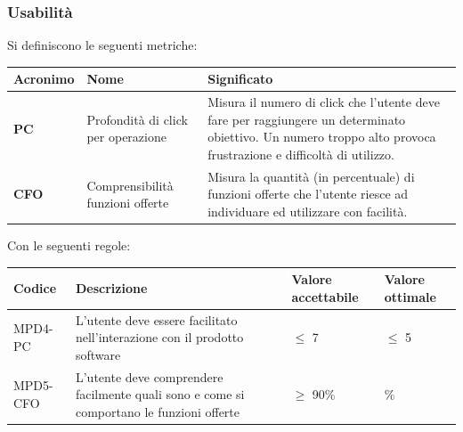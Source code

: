 \subsubsection{Usabilità}
\par Si definiscono le seguenti metriche:
\begin{table}[h!]
\centering
\def\arraystretch{1.5}
\begin{tabular}{ |m{2cm}|m{5.5cm}|m{6.5cm}| }
\hline
\rowcolor{lightgray!30}
\textbf{Acronimo} & \textbf{Nome} & \textbf{Significato}\\
\hline
\textbf{PC} & Profondità di click per operazione & Misura il numero di click che l'utente deve fare per raggiungere un determinato obiettivo. Un numero troppo alto provoca frustrazione e difficoltà di utilizzo.\\
\hline
\textbf{CFO} & Comprensibilità funzioni offerte & Misura la quantità (in percentuale) di funzioni offerte che l'utente riesce ad individuare ed utilizzare con facilità.\\
\hline
\end{tabular}
\end{table}
\newpage
\par Con le seguenti regole:
\begin{table}[h!]
\centering
\def\arraystretch{1.5}
\begin{tabular}{ |>{\centering\arraybackslash}m{2.5cm}|>{\centering\arraybackslash}m{5.5cm}|>{\centering\arraybackslash}m{3cm}|>{\centering\arraybackslash}m{3cm}| }
\hline
\rowcolor{black}
\textbf{\color{white} Codice} & \textbf{\color{white} Descrizione} & \textbf{\color{white} Valore accettabile} & \textbf{\color{white} Valore ottimale}\\
\hline
MPD4-PC & L'utente deve essere facilitato nell'interazione con il prodotto software & $\leq$ 7 & $\leq$ 5 \\
\hline
MPD5-CFO & L'utente deve comprendere facilmente quali sono e come si comportano le funzioni offerte & $\geq$ 90\% & 100\% \\
\hline
\end{tabular}
\end{table}

